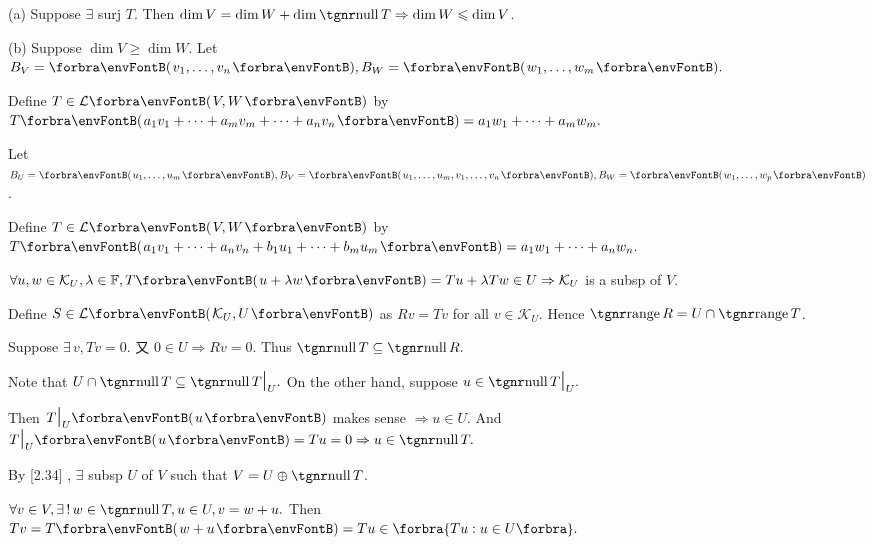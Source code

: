 \par\quad
(a) Suppose $\exists$ surj $T$. Then $\dim V=\dim W+\dim\null T\Rightarrow\dim W\leqslant\dim V$.\par\quad
(b) Suppose $\dim V\geqslant\dim W.$ Let $B_V=\Par{v_1,\dots,v_n},B_W=\Par{w_1,\dots,w_m}.$\par\quad\Hb
Define $T\in\Lm{V,W}$ by $T\Par{a_1 v_1+\dots+a_m v_m+\dots+a_n v_n}=a_1 w_1+\dots+a_m w_m.$\PfEnd
\SepLine

\par\quad
Let $B_U=\Par{u_1,\dots,u_m},B_V=\Par{u_1,\dots,u_m,v_1,\dots,v_n},B_W=\Par{w_1,\dots,w_p}$.\par\quad
Define $T\in\Lm{V,W}$ by $T\Par{a_1 v_1+\dots+a_n v_n+b_1 u_1+\dots+b_m u_m}=a_1 w_1+\dots+a_n w_n.$\PfEnd
\SepLine

\par\quad
$\forall u,w\in\mathcal{K}_U,\lambda\in\Fbb,T\Par{u+\lambda w}=Tu+\lambda Tw\in U\Rightarrow \mathcal{K}_U$ is a subsp of $V$.\par\quad
Define $S\in\Lm{\mathcal{K}_U,U}$ as $Rv=Tv$ for all $v\in\mathcal{K}_U$. Hence $\range R=U\cap \range T$.\par\quad
Suppose $\exists\,v,Tv=0$. 又 $0\in U\Rightarrow Rv=0$. Thus $\null T\subseteq\null R.$\PfEnd
\SepLine

Note that $U\cap\null T\subseteq\null T\mmid_U.$ On the other hand, suppose $u\in\null T\mmid_U.$\par
\Blind{\Solution} Then $T\mmid_U\Par{u}$ makes sense $\Rightarrow u\in U.$ And $T\mmid_U\Par{u}=Tu=0\Rightarrow u\in\null T.$\PfEnd
\SepLine

\par\quad
By [2.34] , $\exists$ subsp $U$ of $V$ such that $V=U\oplus\null T$.\par\quad
$\forall v\in V,\exists\,!\,w\in\null T,u\in U, v=w+u.$ Then $Tv=T\Par{w+u}=Tu\in\Bra{Tu:u\in U}.$\PfEnd
\SepLine

